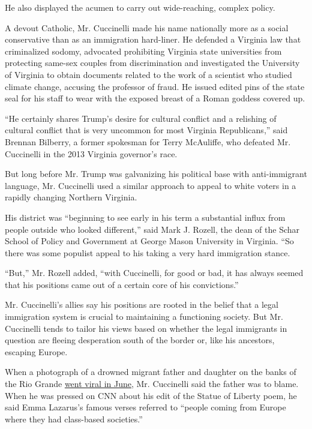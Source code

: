He also displayed the acumen to carry out wide-reaching, complex policy.

A devout Catholic, Mr. Cuccinelli made his name nationally more as a
social conservative than as an immigration hard-liner. He defended a
Virginia law that criminalized sodomy, advocated prohibiting Virginia
state universities from protecting same-sex couples from discrimination
and investigated the University of Virginia to obtain documents related
to the work of a scientist who studied climate change, accusing the
professor of fraud. He issued edited pins of the state seal for his
staff to wear with the exposed breast of a Roman goddess covered up.

``He certainly shares Trump's desire for cultural conflict and a
relishing of cultural conflict that is very uncommon for most Virginia
Republicans,'' said Brennan Bilberry, a former spokesman for Terry
McAuliffe, who defeated Mr. Cuccinelli in the 2013 Virginia governor's
race.

But long before Mr. Trump was galvanizing his political base with
anti-immigrant language, Mr. Cuccinelli used a similar approach to
appeal to white voters in a rapidly changing Northern Virginia.

His district was ``beginning to see early in his term a substantial
influx from people outside who looked different,'' said Mark J. Rozell,
the dean of the Schar School of Policy and Government at George Mason
University in Virginia. ``So there was some populist appeal to his
taking a very hard immigration stance.

``But,'' Mr. Rozell added, ``with Cuccinelli, for good or bad, it has
always seemed that his positions came out of a certain core of his
convictions.''

Mr. Cuccinelli's allies say his positions are rooted in the belief that
a legal immigration system is crucial to maintaining a functioning
society. But Mr. Cuccinelli tends to tailor his views based on whether
the legal immigrants in question are fleeing desperation south of the
border or, like his ancestors, escaping Europe.

When a photograph of a drowned migrant father and daughter on the banks
of the Rio Grande
\href{https://www.nytimes3xbfgragh.onion/2019/06/25/us/father-daughter-border-drowning-picture-mexico.html}{went
viral in June}, Mr. Cuccinelli said the father was to blame. When he was
pressed on CNN about his edit of the Statue of Liberty poem, he said
Emma Lazarus's famous verses referred to ``people coming from Europe
where they had class-based societies.''

